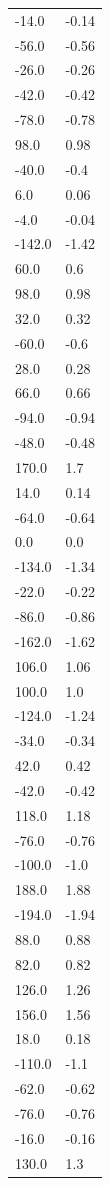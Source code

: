 \begin{longtable}{ll}
-14.0 & -0.14 \\
-56.0 & -0.56 \\
-26.0 & -0.26 \\
-42.0 & -0.42 \\
-78.0 & -0.78 \\
98.0 & 0.98 \\
-40.0 & -0.4 \\
6.0 & 0.06 \\
-4.0 & -0.04 \\
-142.0 & -1.42 \\
60.0 & 0.6 \\
98.0 & 0.98 \\
32.0 & 0.32 \\
-60.0 & -0.6 \\
28.0 & 0.28 \\
66.0 & 0.66 \\
-94.0 & -0.94 \\
-48.0 & -0.48 \\
170.0 & 1.7 \\
14.0 & 0.14 \\
-64.0 & -0.64 \\
0.0 & 0.0 \\
-134.0 & -1.34 \\
-22.0 & -0.22 \\
-86.0 & -0.86 \\
-162.0 & -1.62 \\
106.0 & 1.06 \\
100.0 & 1.0 \\
-124.0 & -1.24 \\
-34.0 & -0.34 \\
42.0 & 0.42 \\
-42.0 & -0.42 \\
118.0 & 1.18 \\
-76.0 & -0.76 \\
-100.0 & -1.0 \\
188.0 & 1.88 \\
-194.0 & -1.94 \\
88.0 & 0.88 \\
82.0 & 0.82 \\
126.0 & 1.26 \\
156.0 & 1.56 \\
18.0 & 0.18 \\
-110.0 & -1.1 \\
-62.0 & -0.62 \\
-76.0 & -0.76 \\
-16.0 & -0.16 \\
130.0 & 1.3 \\

\end{longtable}
